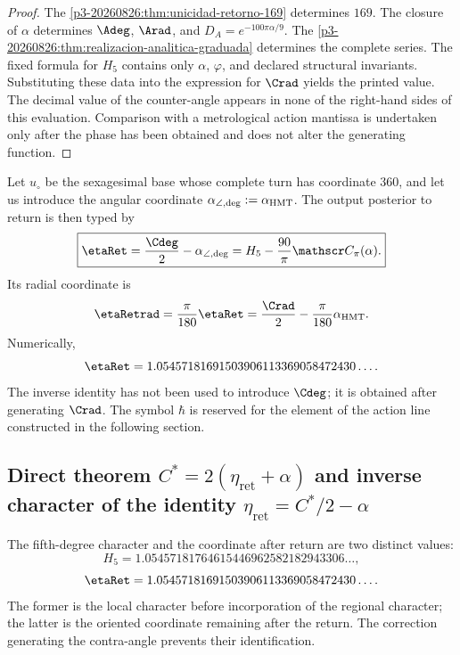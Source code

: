 \begin{proof}
The \cref{p3-20260826:thm:unicidad-retorno-169} determines \(169\). The closure of \(\alpha\) determines \(\Adeg\), \(\Arad\), and \(D_A=e^{-100\pi\alpha/9}\). The \cref{p3-20260826:thm:realizacion-analitica-graduada} determines the complete series. The fixed formula for \(H_5\) contains only \(\alpha\), \(\varphi\), and declared structural invariants. Substituting these data into the expression for \(\Crad\) yields the printed value. The decimal value of the counter-angle appears in none of the right-hand sides of this evaluation. Comparison with a metrological action mantissa is undertaken only after the phase has been obtained and does not alter the generating function.
\end{proof}

Let \(u_\circ\) be the sexagesimal base whose complete turn has coordinate
\(360\), and let us introduce the angular coordinate
\(\alpha_{\angle,{\rm deg}}:=\alpha_{\rm HMT}\). The output posterior to
return is then typed by
\[
\boxed{
\etaRet
=\frac{\Cdeg}2-\alpha_{\angle,{\rm deg}}
=H_5-\frac{90}{\pi}\mathscr C_\pi(\alpha).}
\]
Its radial coordinate is
\[
 \etaRetrad=\frac{\pi}{180}\etaRet
 =\frac{\Crad}{2}-\frac{\pi}{180}\alpha_{\rm HMT}.
\]
Numerically,
\[
\etaRet
=1.05457181691503906113369058472430\ldots.
\]
The inverse identity has not been used to introduce \(\Cdeg\); it is obtained
after generating \(\Crad\). The symbol \(\hbar\) is reserved for the
element of the action line constructed in the following section.

\subsection{Direct theorem \texorpdfstring{\(C^*=2(\eta_{\mathrm{ret}}+\alpha)\)}{C*=2(eta_ret+alpha)} and inverse character of the identity \texorpdfstring{\(\eta_{\mathrm{ret}}=C^*/2-\alpha\)}{eta_ret=C*/2-alpha}}
\label{sec:s102:c38:4:3}


The fifth-degree character and the coordinate after return
are two distinct values:
\[
H_5
=1.05457181764615446962582182943306\ldots,
\]
\[
\etaRet
=1.05457181691503906113369058472430\ldots.
\]
The former is the local character before incorporation of the regional character; the
latter is the oriented coordinate remaining after the return. The correction
generating the contra-angle prevents their identification.

